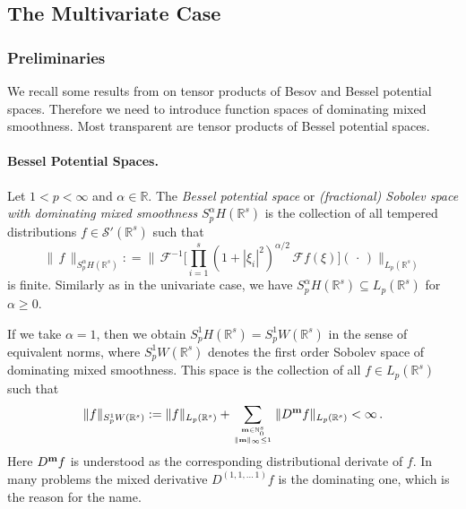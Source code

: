 \documentclass[12pt]{article}
\newcommand{\real}{\mathbb{R}}
\newcommand{\cf}{{\mathcal{F}}}
\newcommand{\cfi}{{\mathcal{F}}^{-1}}
\newcommand{\N}{\mathbb{N}}
\begin{document}
\subsection{The Multivariate Case} %
\label{Subsec:Besov_Multi}


\subsubsection{Preliminaries}


We recall some results from \cite{SU1,SU2}
on tensor products of Besov and Bessel potential spaces.
Therefore we need to introduce function spaces of dominating mixed smoothness.
Most transparent are tensor products of Bessel potential spaces.

\paragraph{Bessel Potential Spaces.}


Let $1<p<\infty$ and $\alpha \in \real$.
The \emph{Bessel potential space} or \emph{(fractional) Sobolev space with dominating mixed smoothness}
$S^\alpha_pH(\real^s)$ is  the collection of all tempered distributions $f
\in \mathcal{S}'(\real^s)$ such that
\[
\| \, f \, \|_{S^{\alpha}_p H(\real^s)}: = \Big\|\, \cfi
\Big[\prod\limits_{i=1}^s (1+|\xi_i|^2)^{\alpha/2}\, \cf f (\xi)
\Big](\, \cdot \, )\Big\|_{L_p(\real^s)}
\]
is finite.  Similarly as in the univariate case, we have $S^\alpha_pH(\real^s) \subseteq L_p(\real^s)$ for $\alpha \ge 0$.

If we take $\alpha =1$, then we obtain $S^{1}_p H(\real^s) = S^{1}_p W(\real^s)$ in the sense of equivalent norms,
where $S^{1}_p W(\real^s)$ denotes the first order Sobolev space of dominating mixed smoothness.
This space is the collection of all $f\in L_p (\real^s)$ such that
\[
 \|f\|_{S^{1}_p W(\real^s)} := \|f\|_{L_p(\real^s)} + \sum_{{{\bf m}\in \N_0^s} \atop \|{\bf m}\|_\infty \le 1}
 \|D^{\bf m} f\|_{L_p (\real^s)}
<\infty\, .
 \]
Here $D^{\bf m} f$ is understood as the corresponding distributional derivate of $f$.
In many problems the mixed derivative $D^{(1, 1, \ldots \, 1)} f$ is the dominating one, which is  the reason for the name.
\end{document}
